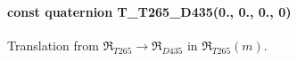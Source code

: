 \paragraph[{\texorpdfstring{T\+\_\+\+T265\+\_\+\+D435}{T_T265_D435}}]{\setlength{\rightskip}{0pt plus 5cm}const {\bf quaternion} T\+\_\+\+T265\+\_\+\+D435(0., 0., 0., 0)\hspace{0.3cm}{\ttfamily [static]}}\hypertarget{Voxel_8cuh_a084c6bfb66f9daa4728fe8355861f1a4}{}\label{Voxel_8cuh_a084c6bfb66f9daa4728fe8355861f1a4}


Translation from $\mathfrak{R}_{T265} \to \mathfrak{R}_{D435}$ in $\mathfrak{R}_{T265} (m)$. 

